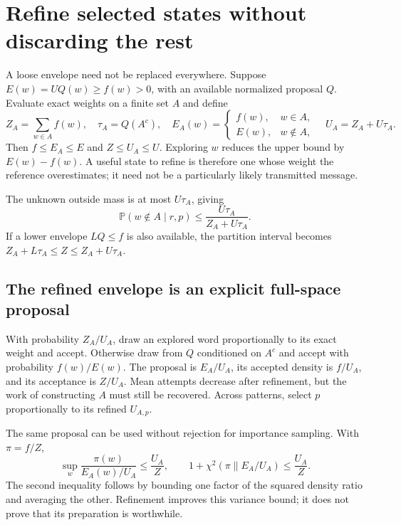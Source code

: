 \documentclass[10pt,a4paper]{article}
\newcommand{\E}{\mathbb E}
\newcommand{\Prb}{\mathbb P}
\begin{document}
\section{Refine selected states without discarding the rest}
\label{sec:repair}
A loose envelope need not be replaced everywhere. Suppose $E(w)=UQ(w)\geq f(w)>0$, with an available
normalized proposal $Q$. Evaluate exact weights on a finite set $A$ and define
\begin{equation}
 Z_A=\sum_{w\in A}f(w),\quad \tau_A=Q(A^c),\quad
 E_A(w)=\begin{cases}f(w),&w\in A,\\E(w),&w\notin A,\end{cases}
 \quad U_A=Z_A+U\tau_A.
 \label{eq:repaired-envelope}
\end{equation}
Then $f\leq E_A\leq E$ and $Z\leq U_A\leq U$. Exploring $w$ reduces the upper bound by
$E(w)-f(w)$. A useful state to refine is therefore one whose weight the reference overestimates;
it need not be a particularly likely transmitted message.

The unknown outside mass is at most $U\tau_A$, giving
\begin{equation}
 \Prb(w\notin A\mid r,p)\leq\frac{U\tau_A}{Z_A+U\tau_A}.
 \label{eq:repaired-miss}
\end{equation}
If a lower envelope $LQ\leq f$ is also available, the partition interval becomes
$Z_A+L\tau_A\leq Z\leq Z_A+U\tau_A$.

\subsection{The refined envelope is an explicit full-space proposal}
With probability $Z_A/U_A$, draw an explored word proportionally to its exact weight and accept.
Otherwise draw from $Q$ conditioned on $A^c$ and accept with probability $f(w)/E(w)$.
The proposal is $E_A/U_A$, its accepted density is $f/U_A$, and its acceptance is $Z/U_A$.
Mean attempts decrease after refinement, but the work of constructing $A$ must still be recovered.
Across patterns, select $p$ proportionally to its refined $U_{A,p}$.

The same proposal can be used without rejection for importance sampling. With $\pi=f/Z$,
\begin{equation}
 \sup_w\frac{\pi(w)}{E_A(w)/U_A}\leq\frac{U_A}{Z},\qquad
 1+\chi^2(\pi\|E_A/U_A)\leq\frac{U_A}{Z}.
 \label{eq:secondmoment}
\end{equation}
The second inequality follows by bounding one factor of the squared density ratio and averaging the
other. Refinement improves this variance bound; it does not prove that its preparation is worthwhile.
\end{document}
